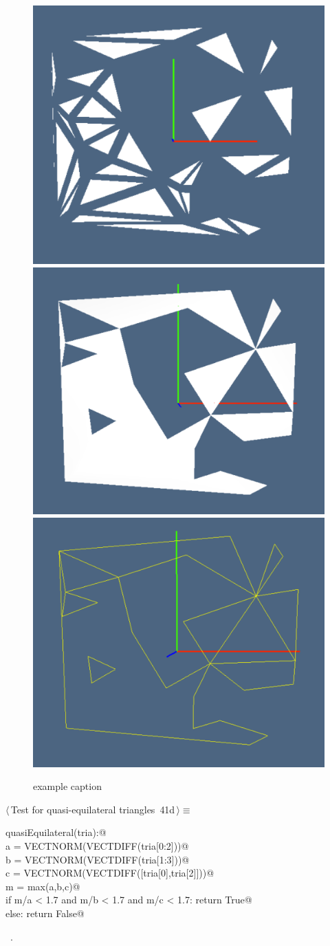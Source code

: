 \documentclass[11pt,oneside]{article}	%
\begin{document}
\begin{figure}[htbp] %
   \centering
   \includegraphics[height=0.25\linewidth,width=0.32\linewidth]{images/tria0} 
   \includegraphics[height=0.25\linewidth,width=0.32\linewidth]{images/tria1} 
   \includegraphics[height=0.25\linewidth,width=0.32\linewidth]{images/tria2} 
   \caption{example caption}
   \label{fig:example}
\end{figure}

\begin{flushleft} \small \label{scrap88}
\protect{}$\langle\,$Test for quasi-equilateral triangles\nobreak\ {\footnotesize 41d}$\,\rangle\equiv$
\vspace{-1ex}
\begin{list}{}{} \item
\mbox{}\verb@def quasiEquilateral(tria):@\\
\mbox{}\verb@    a = VECTNORM(VECTDIFF(tria[0:2]))@\\
\mbox{}\verb@    b = VECTNORM(VECTDIFF(tria[1:3]))@\\
\mbox{}\verb@    c = VECTNORM(VECTDIFF([tria[0],tria[2]]))@\\
\mbox{}\verb@    m = max(a,b,c)@\\
\mbox{}\verb@    if m/a < 1.7 and m/b < 1.7 and m/c < 1.7: return True@\\
\mbox{}\verb@    else: return False@\\
\mbox{}\verb@@{\NWsep}
\end{list}
\vspace{-1ex}
\footnotesize\addtolength{\baselineskip}{-1ex}
\begin{list}{}{\setlength{\itemsep}{-\parsep}\setlength{\itemindent}{-\leftmargin}}
\item \NWtxtMacroRefIn\ .
\end{list}
\end{flushleft}
\end{document}
